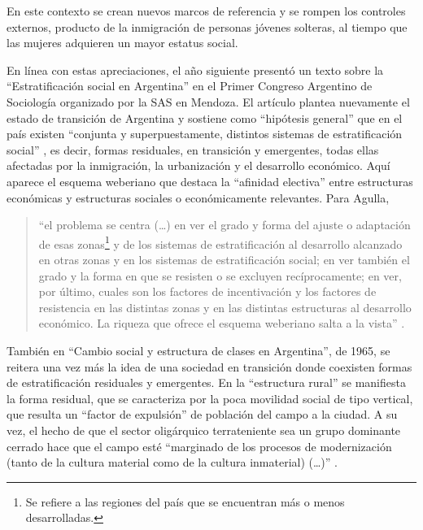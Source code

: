 En este contexto se crean nuevos marcos de referencia y se rompen los controles externos, producto de la inmigración de personas jóvenes solteras, al tiempo que las mujeres adquieren un mayor estatus social.

En línea con estas apreciaciones, el año siguiente presentó un texto sobre la \enquote{Estratificación social en Argentina} en el Primer Congreso Argentino de Sociología organizado por la SAS en Mendoza. El artículo plantea nuevamente el estado de transición de Argentina y sostiene como \enquote{hipótesis general} que en el país existen \enquote{conjunta y superpuestamente, distintos sistemas de estratificación social} \parencite[99]{1641-AGULLA1965}, es decir, formas residuales, en transición y emergentes, todas ellas afectadas por la inmigración, la urbanización y el desarrollo económico. Aquí aparece el esquema weberiano que destaca la \enquote{afinidad electiva} entre estructuras económicas y estructuras sociales o económicamente relevantes. Para Agulla,

\begin{quote}
\enquote{el problema se centra (\dots) en ver el grado y forma del ajuste o adaptación de esas zonas\footnote{Se refiere a las regiones del país que se encuentran más o menos desarrolladas.} y de los sistemas de estratificación al desarrollo alcanzado en otras zonas y en los sistemas de estratificación social; en ver también el grado y la forma en que se resisten o se excluyen recíprocamente; en ver, por último, cuales son los factores de incentivación y los factores de resistencia en las distintas zonas y en las distintas estructuras al desarrollo económico. La riqueza que ofrece el esquema weberiano salta a la vista} \parencite[101]{1641-AGULLA1965}.
\end{quote}

También en \enquote{Cambio social y estructura de clases en Argentina}, de 1965, se reitera una vez más la idea de una sociedad en transición donde coexisten formas de estratificación residuales y emergentes. En la \enquote{estructura rural} se manifiesta la forma residual, que se caracteriza por la poca movilidad social de tipo vertical, que resulta un \enquote{factor de expulsión} de población del campo a la ciudad. A su vez, el hecho de que el sector oligárquico terrateniente sea un grupo dominante cerrado hace que el campo esté \enquote{marginado de los procesos de modernización (tanto de la cultura material como de la cultura inmaterial) (\dots)} \parencite[118]{1641-AGULLA1965}.

